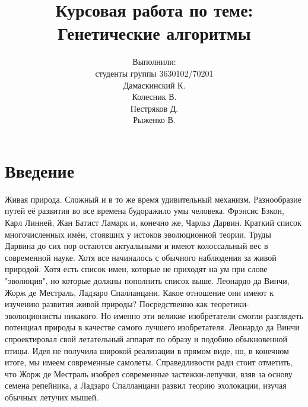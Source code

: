 


\thispagestyle{empty}


\title{Курсовая работа по теме: \\ Генетические алгоритмы}
\author{Выполнили:\\студенты группы 3630102/70201\\Дамаскинский К.\\Колесник В.\\Пестряков Д.\\Рыженко В.}
\maketitle

\pagestyle{fancy}
\fancyhf{}
\fancyfoot[C]{\thepage}
\renewcommand{\headrulewidth}{0pt}
\renewcommand{\footrulewidth}{0pt}
\tableofcontents
\pagebreak

\newcommand{\defn}[1]{\textbf{\textit{#1}}}

\chapter*{Введение}
Живая природа. Сложный и в то же время удивительный механизм. Разнообразие путей её развития во все времена будоражило умы человека.
Фрэнсис Бэкон, Карл Линней, Жан Батист Ламарк и, конечно же, Чарльз Дарвин. Краткий список многочисленных имён, стоявших у истоков эволюционной теории. Труды Дарвина до сих пор остаются актуальными и имеют колоссальный вес в современной науке. Хотя все начиналось с обычного наблюдения за живой природой.
Хотя есть список имен, которые не приходят на ум при слове "эволюция", но которые должны пополнить список выше. Леонардо да Винчи, Жорж де Местраль, Ладзаро Спалланцани. Какое отношение они имеют к изучению развития живой природы? Посредственно как теоретики-эволюционисты никакого. Но именно эти великие изобретатели смогли разглядеть потенциал природы в качестве самого лучшего изобретателя. Леонардо да Винчи спроектировал свой летательный аппарат по образу и подобию обыкновенной птицы. Идея не получила широкой реализации в прямом виде, но, в конечном итоге, мы имеем современные самолеты. Справедливости ради стоит отметить, что Жорж де Местраль изобрел современные застежки-лепучки, взяв за основу семена репейника, а Ладзаро Спалланцани развил теорию эхолокации, изучая обычных летучих мышей.

